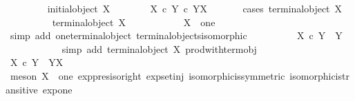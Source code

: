 \begin{isabellebody}
\ \ \ \ \ \ \isamarkupfalse%
\ {\isachardoublequoteopen}{\isasymnot}\ initial{\isacharunderscore}{\kern0pt}object\ X{\isachardoublequoteclose}\isanewline
\ \ \ \ \ \ \isamarkupfalse%
\ {\isachardoublequoteopen}X\ {\isasymtimes}\isactrlsub c\ Y\ {\isasymle}\isactrlsub c\ Y\isactrlbsup X\isactrlesup {\isachardoublequoteclose}\isanewline
\ \ \ \ \ \ \isamarkupfalse%
{\isacharparenleft}{\kern0pt}cases\ {\isachardoublequoteopen}terminal{\isacharunderscore}{\kern0pt}object\ X{\isachardoublequoteclose}{\isacharparenright}{\kern0pt}\isanewline
\ \ \ \ \ \ \ \ \isamarkupfalse%
\ {\isachardoublequoteopen}terminal{\isacharunderscore}{\kern0pt}object\ X{\isachardoublequoteclose}\isanewline
\ \ \ \ \ \ \ \ \isamarkupfalse%
\ \isamarkupfalse%
\ {\isachardoublequoteopen}X\ {\isasymcong}\ one{\isachardoublequoteclose}\isanewline
\ \ \ \ \ \ \ \ \ \ \isamarkupfalse%
\ {\isacharparenleft}{\kern0pt}simp\ add{\isacharcolon}{\kern0pt}\ one{\isacharunderscore}{\kern0pt}terminal{\isacharunderscore}{\kern0pt}object\ terminal{\isacharunderscore}{\kern0pt}objects{\isacharunderscore}{\kern0pt}isomorphic{\isacharparenright}{\kern0pt}\isanewline
\ \ \ \ \ \ \ \ \isamarkupfalse%
\ {\isachardoublequoteopen}X\ {\isasymtimes}\isactrlsub c\ Y\ {\isasymcong}\ Y{\isachardoublequoteclose}\isanewline
\ \ \ \ \ \ \ \ \ \ \isamarkupfalse%
\ {\isacharparenleft}{\kern0pt}simp\ add{\isacharcolon}{\kern0pt}\ {\isacartoucheopen}terminal{\isacharunderscore}{\kern0pt}object\ X{\isacartoucheclose}\ prod{\isacharunderscore}{\kern0pt}with{\isacharunderscore}{\kern0pt}term{\isacharunderscore}{\kern0pt}obj{}{\isacharparenright}{\kern0pt}\isanewline
\ \ \ \ \ \ \ \ \isamarkupfalse%
\ \isamarkupfalse%
\ {\isachardoublequoteopen}X\ {\isasymtimes}\isactrlsub c\ Y\ {\isasymcong}\ Y\isactrlbsup X\isactrlesup {\isachardoublequoteclose}\isanewline
\ \ \ \ \ \ \ \ \ \ \isamarkupfalse%
\ {\isacharparenleft}{\kern0pt}meson\ {\isacartoucheopen}X\ {\isasymcong}\ one{\isacartoucheclose}\ exp{\isacharunderscore}{\kern0pt}pres{\isacharunderscore}{\kern0pt}iso{\isacharunderscore}{\kern0pt}right\ exp{\isacharunderscore}{\kern0pt}set{\isacharunderscore}{\kern0pt}inj\ isomorphic{\isacharunderscore}{\kern0pt}is{\isacharunderscore}{\kern0pt}symmetric\ isomorphic{\isacharunderscore}{\kern0pt}is{\isacharunderscore}{\kern0pt}transitive\ exp{\isacharunderscore}{\kern0pt}one{\isacharparenright}{\kern0pt}\isanewline
\ \ \ \ \ \ \ \ \isamarkupfalse%

\end{isabellebody}
